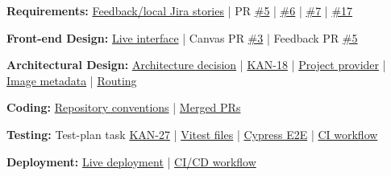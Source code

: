 \documentclass[10pt,a4paper]{article}
\newcommand{\ghbase}{https://github.com/lkevincc0/mm-local-editor}
\newcommand{\PR}[1]{\href{\ghbase/pull/#1}{\##1}}
\newcommand{\jirabase}{https://student-team-zvzgb5e3.atlassian.net}
\newcommand{\JIRA}[1]{\href{\jirabase/browse/KAN-#1}{KAN-#1}}
\newcommand{\wikibase}{https://student-team-zvzgb5e3.atlassian.net/wiki/spaces/~7120206e0163ea5d37428b992775145124d7e8/pages/}
\newcommand{\wpage}[2]{\href{\wikibase#1}{#2}}
\begin{document}
\textbf{\color{accent}Requirements:} \href{\jirabase/issues/?jql=key\%20in\%20\%28KAN-12\%2CKAN-13\%2CKAN-14\%2CKAN-15\%2CKAN-16\%2CKAN-18\%2CKAN-21\%2CKAN-34\%29\%20ORDER\%20BY\%20key\%20ASC}{Feedback/local Jira stories} | PR \PR{5} | \PR{6} | \PR{7} | \PR{17}

\textbf{\color{accent}Front-end Design:} \href{https://lkevincc0.github.io/mm-local-editor/}{Live interface} | Canvas PR \PR{3} | Feedback PR \PR{5}

\textbf{\color{accent}Architectural Design:} \wpage{557378}{Architecture decision} | \JIRA{18} | \href{\ghbase/blob/develop/src/components/context/ProjectProvider.tsx}{Project provider} | \href{\ghbase/blob/develop/src/components/utils/imageMetadata.ts}{Image metadata} | \href{\ghbase/blob/develop/src/components/utils/basename.ts}{Routing}

\textbf{\color{accent}Coding:} \href{\ghbase/blob/develop/AGENTS.md}{Repository conventions} | \href{\ghbase/pulls?q=is\%3Apr+is\%3Amerged}{Merged PRs}

\textbf{\color{accent}Testing:} Test-plan task \JIRA{27} | \href{\ghbase/tree/develop/src}{Vitest files} | \href{\ghbase/tree/develop/cypress}{Cypress E2E} | \href{\ghbase/blob/develop/.github/workflows/ci-cd.yml}{CI workflow}

\textbf{\color{accent}Deployment:} \href{https://lkevincc0.github.io/mm-local-editor/}{Live deployment} | \href{\ghbase/blob/develop/.github/workflows/ci-cd.yml}{CI/CD workflow}
\end{document}
